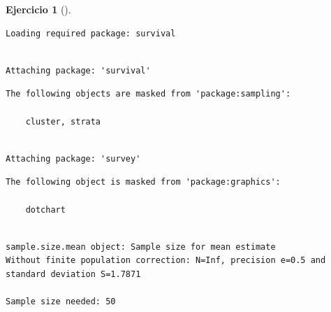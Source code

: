 \documentclass[
  a4paper,
]{scrreport}
\newenvironment{Shaded}{\begin{snugshade}}{\end{snugshade}}
\newcommand{\AttributeTok}[1]{\textcolor[rgb]{0.40,0.45,0.13}{#1}}
\newcommand{\FloatTok}[1]{\textcolor[rgb]{0.68,0.00,0.00}{#1}}
\newcommand{\FunctionTok}[1]{\textcolor[rgb]{0.28,0.35,0.67}{#1}}
\newcommand{\NormalTok}[1]{\textcolor[rgb]{0.00,0.23,0.31}{#1}}
\newcommand{\SpecialCharTok}[1]{\textcolor[rgb]{0.37,0.37,0.37}{#1}}
\theoremstyle{definition}
\newtheorem{exercise}{Ejercicio}[chapter]
\theoremstyle{remark}
\begin{document}
\begin{exercise}[]
\begin{enumerate}
\begin{tcolorbox}
\begin{verbatim}
Loading required package: survival
\end{verbatim}

\begin{verbatim}

Attaching package: 'survival'
\end{verbatim}

\begin{verbatim}
The following objects are masked from 'package:sampling':

    cluster, strata
\end{verbatim}

\begin{verbatim}

Attaching package: 'survey'
\end{verbatim}

\begin{verbatim}
The following object is masked from 'package:graphics':

    dotchart
\end{verbatim}

\begin{Shaded}
\end{Shaded}

\begin{verbatim}

sample.size.mean object: Sample size for mean estimate
Without finite population correction: N=Inf, precision e=0.5 and standard deviation S=1.7871

Sample size needed: 50
\end{verbatim}

  \end{tcolorbox}
\end{enumerate}

\end{exercise}
\end{document}
